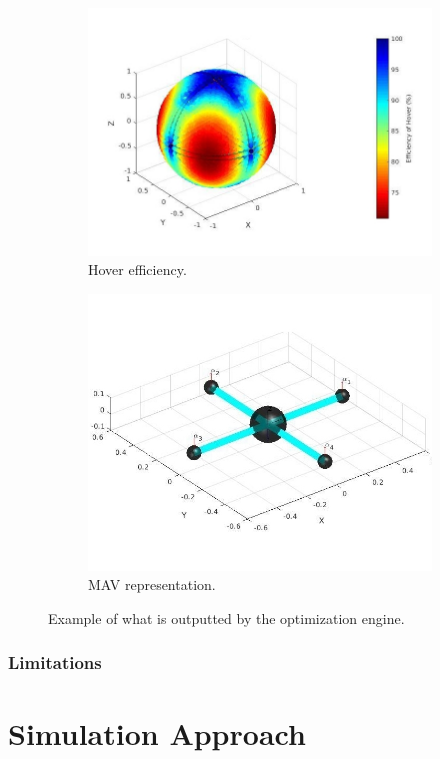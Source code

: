 \begin{figure}[!h]
\begin{subfigure}[b]{0.48\textwidth}
    \includegraphics[width=\linewidth]{images/n=4_hover.jpg}
    \caption{Hover efficiency.} \label{fig:tool_outputc}
  \end{subfigure}
  \hspace*{\fill} %
  \begin{subfigure}[b]{0.48\textwidth}
    \includegraphics[width=\linewidth]{images/n=4_model.jpg}
    \caption{MAV representation.} \label{fig:tool_outputd}
  \end{subfigure}
  \caption{Example of what is outputted by the optimization engine.}
  \label{fig:tool_output}
\end{figure}

\subsubsection{Limitations}
\label{sec:limitations}

\section{Simulation Approach}
\label{sec:control_approach}
